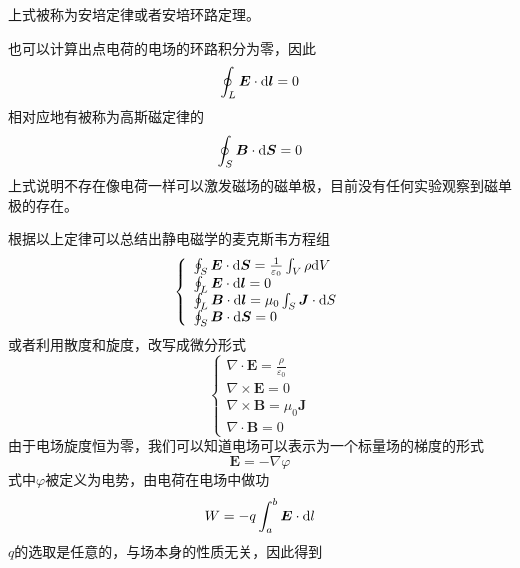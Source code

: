 \documentclass[UTF8,a4paper,10pt]{ctexart}
\begin{document}
\begin{multicols}{2}
\begin{equation}
        \end{equation}
        上式被称为安培定律或者安培环路定理。\par
        也可以计算出点电荷的电场的环路积分为零，因此
        \begin{equation}
            \oint_L\bm{E}\cdot{\rm d}\bm{l} = 0
        \end{equation}
        相对应地有被称为高斯磁定律的
        \begin{equation}
            \oint_S\bm{B}\cdot{\rm d}\bm{S} = 0
        \end{equation}
        上式说明不存在像电荷一样可以激发磁场的磁单极，目前没有任何实验观察到磁单极的存在。\par
        根据以上定律可以总结出静电磁学的麦克斯韦方程组
        \begin{equation}
            \left\{\begin{array}{l}
                \oint_S\bm{E}\cdot{\rm d}\bm{S} = \frac{1}{\varepsilon_0}\int_V\rho{\rm d}V\\
                \oint_L\bm{E}\cdot{\rm d}\bm{l} = 0\\
                \oint_L\bm{B}\cdot{\rm d}\bm{l} = \mu_0\int_S\bm{J}\cdot{\rm d}S\\
                \oint_S\bm{B}\cdot{\rm d}\bm{S} = 0
            \end{array}\right.
        \end{equation}
        或者利用散度和旋度，改写成微分形式
        \begin{equation}
            \left\{\begin{array}{l}
                \nabla\cdot\bm{E} = \frac{\rho}{\varepsilon_0}\\
                \nabla\times\bm{E} = 0\\
                \nabla\times\bm{B} = \mu_0\bm{J}\\
                \nabla\cdot\bm{B} = 0
            \end{array}\right.
        \end{equation}
        由于电场旋度恒为零，我们可以知道电场可以表示为一个标量场的梯度的形式
        \begin{equation}
            \bm{E} = -\nabla\varphi
        \end{equation}
        式中$\varphi$被定义为电势，由电荷在电场中做功
        \begin{equation}
            W = -q\int_a^b\bm{E}\cdot{\rm d}l
        \end{equation}
        $q$的选取是任意的，与场本身的性质无关，因此得到

\end{multicols}
\end{document}
